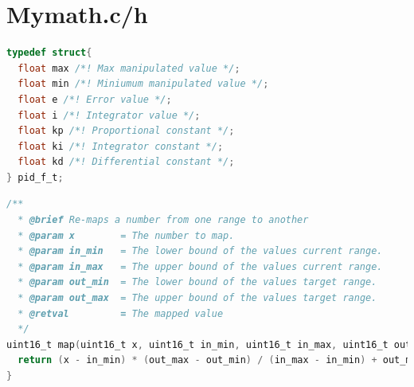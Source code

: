 \documentclass[paper=a4,11pt]{scrreprt}
\begin{document}
\section{Mymath.c/h}
\begin{lstlisting}[language=C, caption=\textbf{pid struct},label={pid}, mathescape=true, breaklines=true]
typedef struct{
  float max /*! Max manipulated value */;
  float min /*! Miniumum manipulated value */;
  float e /*! Error value */;
  float i /*! Integrator value */;
  float kp /*! Proportional constant */;
  float ki /*! Integrator constant */;
  float kd /*! Differential constant */;
} pid_f_t;
\end{lstlisting}

\begin{lstlisting}[language=C, caption=\textbf{uint16\_t map()},label={map}, mathescape=true, breaklines=true]
/**
  * @brief Re-maps a number from one range to another
  * @param x 		= The number to map.
  * @param in_min	= The lower bound of the values current range.
  * @param in_max	= The upper bound of the values current range.
  * @param out_min	= The lower bound of the values target range.
  * @param out_max	= The upper bound of the values target range.
  * @retval			= The mapped value
  */
uint16_t map(uint16_t x, uint16_t in_min, uint16_t in_max, uint16_t out_min, uint16_t out_max) {
  return (x - in_min) * (out_max - out_min) / (in_max - in_min) + out_min;
}
\end{lstlisting}
\end{document}
